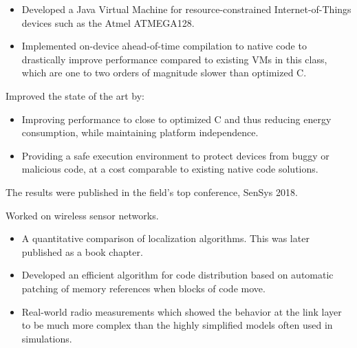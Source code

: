 \documentclass[10pt,a4paper]{../altacv}
\begin{document}
\medskip


\medskip


\medskip

\begin{itemize}
	\item Developed a Java Virtual Machine for resource-constrained Internet-of-Things devices such as the Atmel ATMEGA128.
	\item Implemented on-device ahead-of-time compilation to native code to drastically improve performance compared to existing VMs in this class, which are one to two orders of magnitude slower than optimized C.
\end{itemize}

\medskip

Improved the state of the art by:

\medskip

\begin{itemize}
	\item Improving performance to close to optimized C and thus reducing energy consumption, while maintaining platform independence.
	\item Providing a safe execution environment to protect devices from buggy or malicious code, at a cost comparable to existing native code solutions.
\end{itemize}

\medskip

The results were published in the field's top conference, SenSys 2018.

\medskip




\medskip\medskip{}

Worked on wireless sensor networks.

\medskip

\begin{itemize}
	\item\small A quantitative comparison of localization algorithms. This was later published as a book chapter.
	\item\small Developed an efficient algorithm for code distribution based on automatic patching of memory references when blocks of code move.
	\item\small Real-world radio measurements which showed the behavior at the link layer to be much more complex than the highly simplified models often used in simulations.
\end{itemize}
\end{document}
